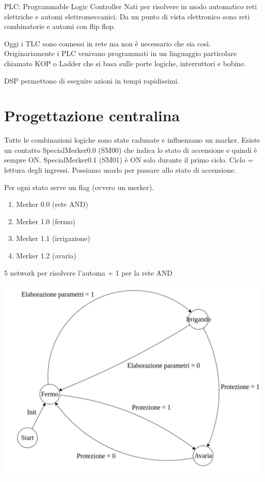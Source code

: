 \documentclass{article}
\begin{document}
    PLC: Programmable Logic Controller
    \newline
    Nati per risolvere in modo automatico reti elettriche e automi elettromeccanici.
    \newline
    Da un punto di vista elettronico sono reti combinatorie e automi con flip flop.

    Oggi i TLC sono connessi in rete ma non è necessario che sia così. Originariamente i PLC venivano programmati in un linguaggio
    particolare chiamato KOP o Ladder che si basa sulle porte logiche, interruttori e bobine.

    DSP permettono di eseguire azioni in tempi rapidissimi.

    \section{Progettazione centralina}

    Tutte le combinazioni logiche sono state radunate e influenzano un marker.
    Esiste un contatto SpecialMerker0.0 (SM00) che indica lo stato di accensione e quindi è sempre ON.
    SpecialMerker0.1 (SM01) è ON solo durante il primo ciclo. Ciclo = lettura degli ingressi. Possiamo usarlo per passare allo stato di accensione.

    Per ogni stato serve un flag (ovvero un merker).

    \begin{enumerate}
        \item Merker 0.0 (rete AND)
        \item Merker 1.0 (fermo)
        \item Merker 1.1 (irrigazione)
        \item Merker 1.2 (avaria)
    \end{enumerate}

    5 network per risolvere l'automa + 1 per la rete AND

    \begin{center}
        \includegraphics[width=\textwidth]{irrigazione_state.png}
    \end{center}
\end{document}
